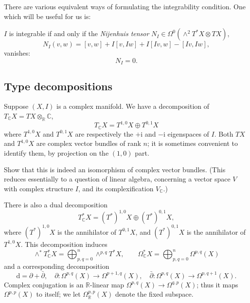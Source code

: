 \documentclass[12pt,letterpaper,reqno]{amsart}
\numberwithin{equation}{section}
\newcommand{\R}{\ensuremath{\mathbb R}}
\newcommand{\C}{\ensuremath{\mathbb C}}
\newcommand{\I}{{\mathrm i}}
\newcommand{\de}{\mathrm{d}}
\newcommand{\ti}[1]{\textit{#1}}
\begin{document}
There are various equivalent ways of formulating the integrability condition. One which will be useful for us is:
\begin{prop} $I$ is integrable if and only if the \ti{Nijenhuis tensor} $N_I \in \Omega^0(\wedge^2 T^*X \otimes TX)$,
\begin{equation}
N_I(v,w) = [v,w] + I[v,Iw] + I[Iv,w] - [Iv,Iw],
\end{equation}
vanishes:
\begin{equation}
N_I = 0.  
\end{equation}
\end{prop}

\subsection{Type decompositions}
Suppose $(X,I)$ is a complex manifold.
We have a decomposition
of $T_\C X = TX \otimes_\R \C$,
\begin{equation}
T_\C X = T^{1,0} X \oplus T^{0,1} X
  \end{equation}
where $T^{1,0} X$ and $T^{0,1} X$ are 
respectively the
$+\I$ and $-\I$ eigenspaces of $I$.
Both $TX$ and $T^{1,0}X$ are complex vector bundles 
of rank $n$; it is sometimes convenient to identify
them, by projection on the $(1,0)$ part.

\begin{exercise}
Show that this is indeed an isomorphism 
of complex vector bundles. (This reduces essentially
to a question of linear algebra, concerning 
a vector space $V$ with complex structure $I$,
and its complexification $V_\C$.)
\end{exercise}

There is also a dual decomposition
\begin{equation}
T^*_\C X = (T^*)^{1,0} X \oplus (T^*)^{0,1} X,
  \end{equation}
where $(T^*)^{1,0} X$ is the annihilator of
$T^{0,1} X$, and $(T^*)^{0,1} X$ is the annihilator of
$T^{1,0} X$.
This decomposition induces
\begin{equation}
\wedge^* T^*_\C X = \bigoplus_{p,q=0}^n \wedge^{p,q} T^* X , \qquad \Omega^*_\C X = \bigoplus_{p,q=0}^n \Omega^{p,q}(X)
\end{equation}
and a corresponding decomposition
\begin{equation}
\de = \partial + \bar\partial, \quad \partial: \Omega^{p,q}(X) \to \Omega^{p+1,q}(X), \quad \bar\partial: \Omega^{p,q}(X) \to \Omega^{p,q+1}(X).
\end{equation}
Complex conjugation is an $\R$-linear map
$\Omega^{p,q}(X) \to \Omega^{q,p}(X)$;
thus it maps $\Omega^{p,p}(X)$ to itself;
we let $\Omega_\R^{p,p}(X)$ denote the fixed subspace.
\end{document}
